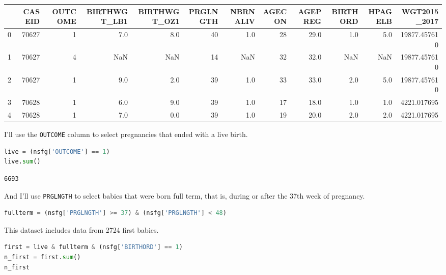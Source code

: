 \begin{tabular}{lrrrrrrrrrrr}
\toprule
{} &  CASEID &  OUTCOME &  BIRTHWGT\_LB1 &  BIRTHWGT\_OZ1 &  PRGLNGTH &  NBRNALIV &  AGECON &  AGEPREG &  BIRTHORD &  HPAGELB &  WGT2015\_2017 \\
\midrule
0 &   70627 &        1 &           7.0 &           8.0 &        40 &       1.0 &      28 &     29.0 &       1.0 &      5.0 &  19877.457610 \\
1 &   70627 &        4 &           NaN &           NaN &        14 &       NaN &      32 &     32.0 &       NaN &      NaN &  19877.457610 \\
2 &   70627 &        1 &           9.0 &           2.0 &        39 &       1.0 &      33 &     33.0 &       2.0 &      5.0 &  19877.457610 \\
3 &   70628 &        1 &           6.0 &           9.0 &        39 &       1.0 &      17 &     18.0 &       1.0 &      1.0 &   4221.017695 \\
4 &   70628 &        1 &           7.0 &           0.0 &        39 &       1.0 &      19 &     20.0 &       2.0 &      2.0 &   4221.017695 \\
\bottomrule
\end{tabular}

I'll use the \passthrough{\lstinline!OUTCOME!} column to select
pregnancies that ended with a live birth.

\begin{lstlisting}[language=Python,style=source]
live = (nsfg['OUTCOME'] == 1)
live.sum()
\end{lstlisting}

\begin{lstlisting}[style=output]
6693
\end{lstlisting}

And I'll use \passthrough{\lstinline!PRGLNGTH!} to select babies that
were born full term, that is, during or after the 37th week of
pregnancy.

\begin{lstlisting}[language=Python,style=source]
fullterm = (nsfg['PRGLNGTH'] >= 37) & (nsfg['PRGLNGTH'] < 48)
\end{lstlisting}

This dataset includes data from 2724 first babies.

\begin{lstlisting}[language=Python,style=source]
first = live & fullterm & (nsfg['BIRTHORD'] == 1)
n_first = first.sum()
n_first
\end{lstlisting}

